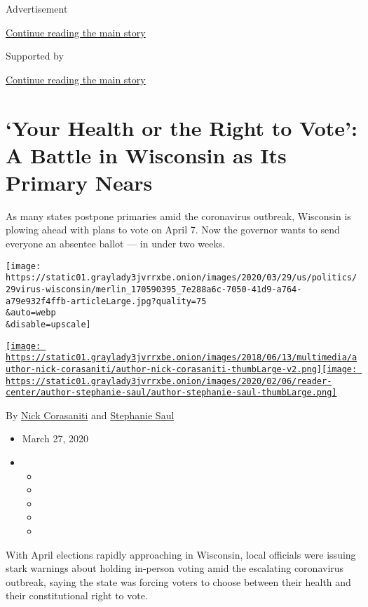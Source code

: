 Advertisement

\protect\hyperlink{after-top}{Continue reading the main story}

Supported by

\protect\hyperlink{after-sponsor}{Continue reading the main story}

\hypertarget{your-health-or-the-right-to-vote-a-battle-in-wisconsin-as-its-primary-nears}{%
\section{`Your Health or the Right to Vote': A Battle in Wisconsin as
Its Primary
Nears}\label{your-health-or-the-right-to-vote-a-battle-in-wisconsin-as-its-primary-nears}}

As many states postpone primaries amid the coronavirus outbreak,
Wisconsin is plowing ahead with plans to vote on April 7. Now the
governor wants to send everyone an absentee ballot --- in under two
weeks.

\texttt{[image: https://static01.graylady3jvrrxbe.onion/images/2020/03/29/us/politics/29virus-wisconsin/merlin\_170590395\_7e288a6c-7050-41d9-a764-a79e932f4ffb-articleLarge.jpg?quality=75\\\&auto=webp\\\&disable=upscale]}

\href{https://www.nytimes3xbfgragh.onion/by/nick-corasaniti}{\texttt{[image: https://static01.graylady3jvrrxbe.onion/images/2018/06/13/multimedia/author-nick-corasaniti/author-nick-corasaniti-thumbLarge-v2.png]}}\href{https://www.nytimes3xbfgragh.onion/by/stephanie-saul}{\texttt{[image: https://static01.graylady3jvrrxbe.onion/images/2020/02/06/reader-center/author-stephanie-saul/author-stephanie-saul-thumbLarge.png]}}

By \href{https://www.nytimes3xbfgragh.onion/by/nick-corasaniti}{Nick
Corasaniti} and
\href{https://www.nytimes3xbfgragh.onion/by/stephanie-saul}{Stephanie
Saul}

\begin{itemize}
\item
  March 27, 2020
\item
  \begin{itemize}
  \item
  \item
  \item
  \item
  \item
  \end{itemize}
\end{itemize}

With April elections rapidly approaching in Wisconsin, local officials
were issuing stark warnings about holding in-person voting amid the
escalating coronavirus outbreak, saying the state was forcing voters to
choose between their health and their constitutional right to vote.

